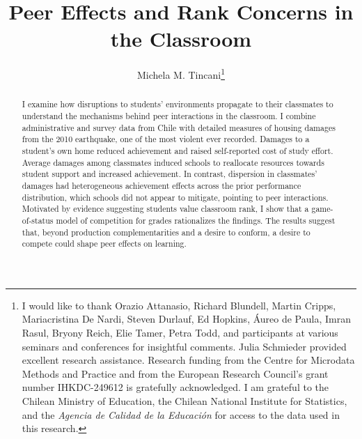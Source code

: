 \documentclass[english,letterpaper,12pt]{article}
\begin{document}
\title{Peer Effects and Rank Concerns in the Classroom} 
\author{ Michela M. Tincani\thanks{ I would like to thank Orazio Attanasio, Richard Blundell, Martin Cripps, Mariacristina De Nardi, Steven Durlauf, Ed Hopkins, \'{A}ureo de Paula, Imran Rasul, Bryony Reich, Elie Tamer, Petra Todd, and participants at various seminars and conferences for insightful comments. Julia Schmieder provided excellent research assistance. Research funding from the Centre for Microdata Methods and Practice and from the European Research Council's grant number IHKDC-249612 is gratefully acknowledged. I am grateful to the Chilean Ministry of Education, the Chilean National Institute for Statistics, and the {\itshape Agencia de Calidad de la Educaci\'{o}n} for access to the data used in this research. }}
	


\maketitle


\begin{abstract}


 I examine how disruptions to students' environments propagate to their classmates to understand the mechanisms behind peer interactions in the classroom. I combine administrative and survey data from Chile with detailed measures of housing damages from the 2010 earthquake, one of the most violent ever recorded. Damages to a student's own home reduced achievement and raised self-reported cost of study effort. Average damages among classmates induced schools to reallocate resources towards student support and increased achievement. In contrast, dispersion in classmates' damages had heterogeneous achievement effects across the prior performance distribution, which schools did not appear to mitigate, pointing to peer interactions. Motivated by evidence suggesting students value classroom rank, I show that a game-of-status model of competition for grades rationalizes the findings. The results suggest that, beyond production complementarities and a desire to conform, a desire to compete could shape peer effects on learning.
 


\end{abstract}

\begin{onehalfspacing}
		
		
		
	






\end{onehalfspacing}
\end{document}
